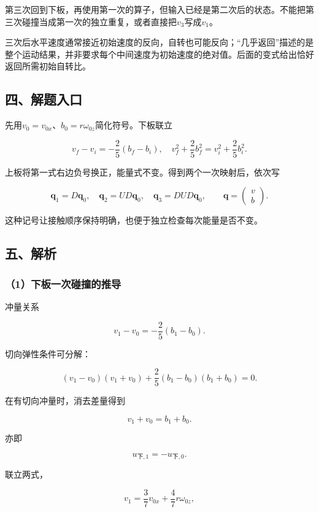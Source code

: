 \documentclass[12pt,a4paper,fontset=fandol]{ctexart}
\begin{document}
第三次回到下板，再使用第一次的算子，但输入已经是第二次后的状态。不能把第三次碰撞当成第一次的独立重复，或者直接把\(v_3\)写成\(v_1\)。

三次后水平速度通常接近初始速度的反向，自转也可能反向；``几乎返回''描述的是整个运动结果，并非要求每个中间速度为初始速度的绝对值。后面的变式给出恰好返回所需初始自转比。

\subsection{四、解题入口}\label{ux56dbux89e3ux9898ux5165ux53e3-2}

先用\(v_0=v_{0x}\)、\(b_0=r\omega_{0z}\)简化符号。下板联立

\[
v_f-v_i=-\frac25(b_f-b_i),\quad
v_f^2+\frac25b_f^2=v_i^2+\frac25b_i^2.
\]

上板将第一式右边负号换正，能量式不变。得到两个一次映射后，依次写

\[
\boldsymbol q_1=D\boldsymbol q_0,\quad
\boldsymbol q_2=UD\boldsymbol q_0,\quad
\boldsymbol q_3=DUD\boldsymbol q_0,
\qquad
\boldsymbol q=\begin{pmatrix}v\\b\end{pmatrix}.
\]

这种记号让接触顺序保持明确，也便于独立检查每次能量是否不变。

\subsection{五、解析}\label{ux4e94ux89e3ux6790-2}

\subsubsection{（1）下板一次碰撞的推导}\label{ux4e0bux677fux4e00ux6b21ux78b0ux649eux7684ux63a8ux5bfc}

冲量关系

\[
v_1-v_0=-\frac25(b_1-b_0).
\]

切向弹性条件可分解：

\[
(v_1-v_0)(v_1+v_0)
+\frac25(b_1-b_0)(b_1+b_0)=0.
\]

在有切向冲量时，消去差量得到

\[
v_1+v_0=b_1+b_0.
\]

亦即

\[
u_{{\text{下}},1}=-u_{{\text{下}},0}.
\]

联立两式，

\[
\boxed{v_1=\frac37v_{0x}+\frac47r\omega_{0z}},
\]
\end{document}
